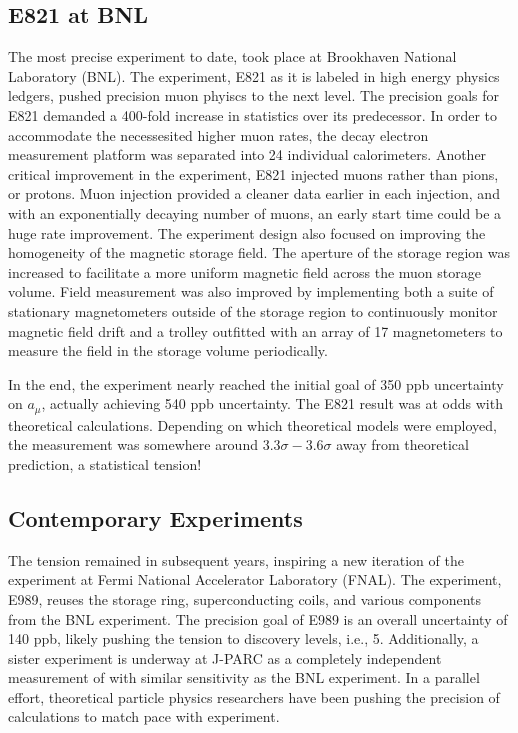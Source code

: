 \subsection{E821 at BNL}
The most precise \mugmtwo experiment to date, took place at Brookhaven National Laboratory (BNL). The experiment, E821 as it is labeled in high energy physics ledgers, pushed precision muon phyiscs to the next level.  The precision goals for E821 demanded a 400-fold increase in statistics over its predecessor.  In order to accommodate the necessesited higher muon rates, the decay electron measurement platform was separated into 24 individual calorimeters.  Another critical improvement in the experiment, E821 injected muons rather than pions, or protons.  Muon injection provided a cleaner data earlier in each injection, and with an exponentially decaying number of muons, an early start time could be a huge rate improvement.  The experiment design also focused on improving the homogeneity of the magnetic storage field.  The aperture of the storage region was increased to facilitate a more uniform magnetic field across the muon storage volume.  Field measurement was also improved by implementing both a suite of stationary magnetometers outside of the storage region to continuously monitor magnetic field drift and a trolley outfitted with an array of 17 magnetometers to measure the field in the storage volume periodically.  

In the end, the experiment nearly reached the initial goal of 350 ppb uncertainty on $a_\mu$, actually achieving 540 ppb uncertainty\cite{e821-prd}.  The E821 \gmtwo result was at odds with theoretical calculations.  Depending on which theoretical models were employed, the measurement was somewhere around $3.3\sigma - 3.6\sigma$ away from theoretical prediction, a statistical tension!

\subsection{Contemporary Experiments}
The tension remained in subsequent years, inspiring a new iteration of the \mugmtwo experiment at Fermi National Accelerator Laboratory (FNAL). The experiment, E989, reuses the storage ring, superconducting coils, and various components from the BNL experiment.  The precision goal of E989 is an overall uncertainty of 140 ppb, likely pushing the tension to discovery levels, i.e., \SI{5}{\sigma}. Additionally, a sister experiment is underway at J-PARC as a completely independent measurement of \mugmtwo with similar sensitivity as the BNL experiment.  In a parallel effort, theoretical particle physics researchers have been pushing the precision of calculations to match pace with experiment\cite{e989-tdr}.
